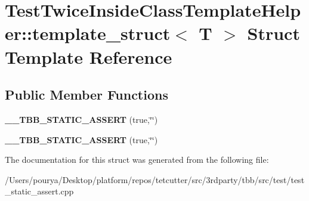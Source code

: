 \hypertarget{structTestTwiceInsideClassTemplateHelper_1_1template__struct}{}\section{Test\+Twice\+Inside\+Class\+Template\+Helper\+:\+:template\+\_\+struct$<$ T $>$ Struct Template Reference}
\label{structTestTwiceInsideClassTemplateHelper_1_1template__struct}
\subsection*{Public Member Functions}
\begin{DoxyCompactItemize}
\item 
\hypertarget{structTestTwiceInsideClassTemplateHelper_1_1template__struct_acf52daaf1c4c547abf9ab67048df4c1e}{}{\bfseries \+\_\+\+\_\+\+T\+B\+B\+\_\+\+S\+T\+A\+T\+I\+C\+\_\+\+A\+S\+S\+E\+R\+T} (true,\char`\"{}\char`\"{})\label{structTestTwiceInsideClassTemplateHelper_1_1template__struct_acf52daaf1c4c547abf9ab67048df4c1e}

\item 
\hypertarget{structTestTwiceInsideClassTemplateHelper_1_1template__struct_acf52daaf1c4c547abf9ab67048df4c1e}{}{\bfseries \+\_\+\+\_\+\+T\+B\+B\+\_\+\+S\+T\+A\+T\+I\+C\+\_\+\+A\+S\+S\+E\+R\+T} (true,\char`\"{}\char`\"{})\label{structTestTwiceInsideClassTemplateHelper_1_1template__struct_acf52daaf1c4c547abf9ab67048df4c1e}

\end{DoxyCompactItemize}


The documentation for this struct was generated from the following file\+:\begin{DoxyCompactItemize}
\item 
/\+Users/pourya/\+Desktop/platform/repos/tetcutter/src/3rdparty/tbb/src/test/test\+\_\+static\+\_\+assert.\+cpp\end{DoxyCompactItemize}
